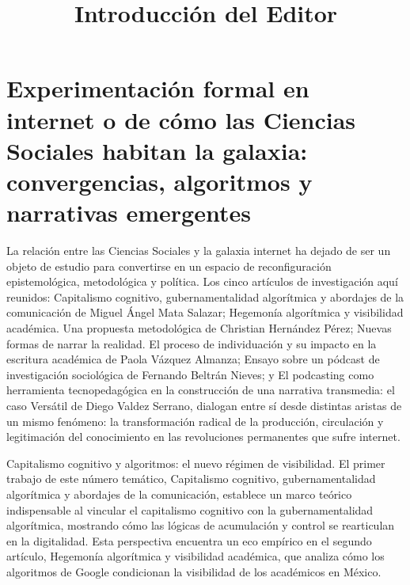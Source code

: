\documentclass[
  letterpaper,
  DIV=11,
  numbers=noendperiod]{scrartcl}
\title{Introducción del Editor}
\author{}
\date{}
\begin{document}
\maketitle


\newcommand{\articuloTitulo}{Introducción del Editor}

\section{Experimentación formal en internet o de cómo las Ciencias
Sociales habitan la galaxia: convergencias, algoritmos y narrativas
emergentes}\label{experimentaciuxf3n-formal-en-internet-o-de-cuxf3mo-las-ciencias-sociales-habitan-la-galaxia-convergencias-algoritmos-y-narrativas-emergentes}

La relación entre las Ciencias Sociales y la galaxia internet ha dejado
de ser un objeto de estudio para convertirse en un espacio de
reconfiguración epistemológica, metodológica y política. Los cinco
artículos de investigación aquí reunidos: Capitalismo cognitivo,
gubernamentalidad algorítmica y abordajes de la comunicación de Miguel
Ángel Mata Salazar; Hegemonía algorítmica y visibilidad académica. Una
propuesta metodológica de Christian Hernández Pérez; Nuevas formas de
narrar la realidad. El proceso de individuación y su impacto en la
escritura académica de Paola Vázquez Almanza; Ensayo sobre un pódcast de
investigación sociológica de Fernando Beltrán Nieves; y El podcasting
como herramienta tecnopedagógica en la construcción de una narrativa
transmedia: el caso Versátil de Diego Valdez Serrano, dialogan entre sí
desde distintas aristas de un mismo fenómeno: la transformación radical
de la producción, circulación y legitimación del conocimiento en las
revoluciones permanentes que sufre internet.

Capitalismo cognitivo y algoritmos: el nuevo régimen de visibilidad. El
primer trabajo de este número temático, Capitalismo cognitivo,
gubernamentalidad algorítmica y abordajes de la comunicación, establece
un marco teórico indispensable al vincular el capitalismo cognitivo con
la gubernamentalidad algorítmica, mostrando cómo las lógicas de
acumulación y control se rearticulan en la digitalidad. Esta perspectiva
encuentra un eco empírico en el segundo artículo, Hegemonía algorítmica
y visibilidad académica, que analiza cómo los algoritmos de Google
condicionan la visibilidad de los académicos en México.
\end{document}
